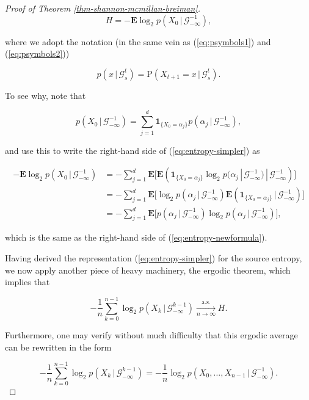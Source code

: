 \begin{proof}[Proof of Theorem \ref{thm-shannon-mcmillan-breiman}]
\begin{equation*} \tag{36}\label{eq:entropy-simpler}
H = -\mathbf{E} \log_2 p(X_0\,|\,\mathcal{G}_{-\infty}^{-1}),
\end{equation*}

\noindent where we adopt the notation (in the same vein as
(\ref{eq:psymbols1}) and (\ref{eq:psymbols2}))

\begin{equation*} \tag{37}\label{eq:psymbols-generalized}
p(x\,|\,\mathcal{G}_s^t) = \mathrm{P}\left(X_{t+1}=x\,|\,\mathcal{G}_s^t\right).
\end{equation*}

\noindent To see why, note that

\[
p(X_0\,|\,\mathcal{G}_{-\infty}^{-1}) = \sum_{j=1}^d \mathbf{1}_{\{X_0=\alpha_j\}} p(\alpha_j\,|\,\mathcal{G}_{-\infty}^{-1}),
\]

\noindent and use this to write the right-hand side of
(\ref{eq:entropy-simpler}) as

\begin{align*}
-\mathbf{E} \log_2 p(X_0\,|\,\mathcal{G}_{-\infty}^{-1})
&=
-\sum_{j=1}^d \mathbf{E}\Big[
\mathbf{E}\left(
\mathbf{1}_{\{X_0=\alpha_j\}}
\log_2 p(\alpha_j\,|\,\mathcal{G}_{-\infty}^{-1})
\,|\,\mathcal{G}_{-\infty}^{-1}\right)
\Big] \\
&= -\sum_{j=1}^d \mathbf{E}\Big[ \log_2 p(\alpha_j\,|\,\mathcal{G}_{-\infty}^{-1})
\mathbf{E}\left(\mathbf{1}_{\{X_0=\alpha_j\}}\,|\,\mathcal{G}_{-\infty}^{-1}\right)
\Big] \\
&= -\sum_{j=1}^d \mathbf{E}\Big[
p(\alpha_j\,|\,\mathcal{G}_{-\infty}^{-1})
\log_2 p(\alpha_j\,|\,\mathcal{G}_{-\infty}^{-1})
\Big],
\end{align*}

\noindent which is the same as the right-hand side of
(\ref{eq:entropy-newformula}).

Having derived the representation
(\ref{eq:entropy-simpler}) for the source entropy, we now
apply another piece of heavy machinery, the ergodic
theorem, which implies that

\[
-\frac{1}{n} \sum_{k=0}^{n-1} \log_2 p(X_k\,|\,\mathcal{G}_{-\infty}^{k-1}) \xrightarrow[n\to\infty]{\textrm{a.s.}} H.
\]

\noindent Furthermore, one may verify without much difficulty
that this ergodic average can be rewritten in the form

\begin{equation*} \tag{38}\label{eq:aep-ergodic-average1}
-\frac{1}{n} \sum_{k=0}^{n-1} \log_2 p(X_k\,|\,\mathcal{G}_{-\infty}^{k-1}) = -\frac{1}{n} \log_2 p(X_0,\ldots,X_{n-1}\,|\,\mathcal{G}_{-\infty}^{-1}).
\end{equation*}


\end{proof}
